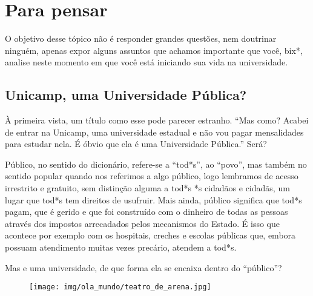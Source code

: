 
\section{Para pensar}

O objetivo desse tópico não é responder grandes questões, nem doutrinar
ninguém, apenas expor alguns assuntos que achamos importante que você, bix*,
analise neste momento em que você está iniciando sua vida na universidade.

\subsection*{Unicamp, uma Universidade Pública?}

À primeira vista, um título como esse pode parecer estranho. ``Mas como? Acabei
de entrar na Unicamp, uma universidade estadual e não vou pagar mensalidades
para estudar nela. É óbvio que ela é uma Universidade Pública.'' Será?

Público, no sentido do dicionário, refere-se a ``tod*s'', ao ``povo'', mas
também no sentido popular quando nos referimos a algo público, logo lembramos
de acesso irrestrito e gratuito, sem distinção alguma a tod*s *s cidadãos e
cidadãs, um lugar que tod*s tem direitos de usufruir. Mais ainda, público
significa que tod*s pagam, que é gerido e que foi construído com o dinheiro de
todas as pessoas através dos impostos arrecadados pelos mecanismos do Estado. É
isso que acontece por exemplo com os hospitais, creches e escolas públicas que,
embora possuam atendimento muitas vezes precário, atendem a tod*s.

Mas e uma universidade, de que forma ela se encaixa dentro do ``público''?

\begin{figure}[h!]
    \centering
    \texttt{[image: img/ola\_mundo/teatro\_de\_arena.jpg]}
\end{figure}

